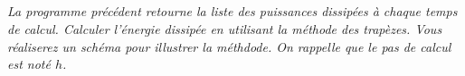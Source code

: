 \documentclass[10pt]{article}
\newif\ifprof
\begin{document}
\subparagraph{}\textit{La programme précédent retourne la liste des puissances dissipées à chaque temps de calcul. Calculer l'énergie dissipée en utilisant la méthode des trapèzes. Vous réaliserez un schéma pour illustrer la méthdode. On rappelle que le pas de calcul est noté $h$.}
\ifprof

\begin{corrige}

\begin{python}
P = calculPuissance(U,c,h)
somme = 0
for i in range(1,len(P)-1):
    somme = somme + P[i]

Energie = (somme + 0.5*(P[0]+P[len(P)-1]))*h
\end{python}
\end{corrige}
\else
\fi
\end{document}
